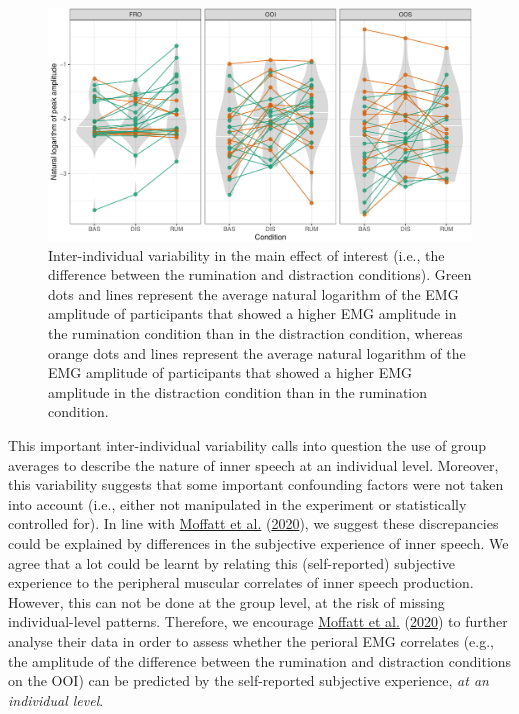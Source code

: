 \documentclass[
  english,
  man, donotrepeattitle,floatsintext]{apa6}
\begin{document}
\begin{figure}[!htb]

{\centering \includegraphics[width=1\linewidth]{manuscript_files/figure-latex/everyone-1} 

}

\caption{Inter-individual variability in the main effect of interest (i.e., the difference between the rumination and distraction conditions). Green dots and lines represent the average natural logarithm of the EMG amplitude of participants that showed a higher EMG amplitude in the rumination condition than in the distraction condition, whereas orange dots and lines represent the average natural logarithm of the EMG amplitude of participants that showed a higher EMG amplitude in the distraction condition than in the rumination condition.}\label{fig:everyone}
\end{figure}

This important inter-individual variability calls into question the use of group averages to describe the nature of inner speech at an individual level. Moreover, this variability suggests that some important confounding factors were not taken into account (i.e., either not manipulated in the experiment or statistically controlled for). In line with \protect\hyperlink{ref-moffatt_inner_2020}{Moffatt et al.} (\protect\hyperlink{ref-moffatt_inner_2020}{2020}), we suggest these discrepancies could be explained by differences in the subjective experience of inner speech. We agree that a lot could be learnt by relating this (self-reported) subjective experience to the peripheral muscular correlates of inner speech production. However, this can not be done at the group level, at the risk of missing individual-level patterns. Therefore, we encourage \protect\hyperlink{ref-moffatt_inner_2020}{Moffatt et al.} (\protect\hyperlink{ref-moffatt_inner_2020}{2020}) to further analyse their data in order to assess whether the perioral EMG correlates (e.g., the amplitude of the difference between the rumination and distraction conditions on the OOI) can be predicted by the self-reported subjective experience, \emph{at an individual level}.
\end{document}
